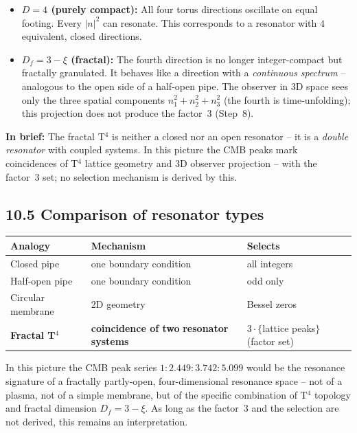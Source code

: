 \begin{itemize}
  \item \textbf{$D = 4$ (purely compact):} All four torus directions
        oscillate on equal footing. Every $|n|^2$ can resonate.
        This corresponds to a resonator with $4$ equivalent,
        closed directions.

  \item \textbf{$D_f = 3 - \xi$ (fractal):} The fourth direction is
        no longer integer-compact but fractally granulated.
        It behaves like a direction with a \emph{continuous
        spectrum} -- analogous to the open side of a half-open pipe.
        The observer in 3D space sees only the three spatial
        components $n_1^2+n_2^2+n_3^2$ (the fourth is time-unfolding);
        this projection does not produce the factor~3 (Step~8).
\end{itemize}

\textbf{In brief:} The fractal T$^4$ is neither a closed nor an
open resonator -- it is a \emph{double resonator} with coupled
systems. In this picture the CMB peaks mark coincidences of T$^4$
lattice geometry and 3D observer projection -- with the factor~3 set; no
selection mechanism is derived by this.

\subsection*{10.5 Comparison of resonator types}

\begin{center}
\begin{tabular}{p{3.5cm}p{3.5cm}p{5cm}}
\toprule
\textbf{Analogy} & \textbf{Mechanism} & \textbf{Selects} \\
\midrule
Closed pipe & one boundary condition & all integers \\
Half-open pipe & one boundary condition & odd only \\
Circular membrane & 2D geometry & Bessel zeros \\
\midrule
\textbf{Fractal T$^4$} &
  \textbf{coincidence of two} \newline \textbf{resonator systems} &
  $3 \cdot \{$lattice peaks$\}$ (factor set) \\
\bottomrule
\end{tabular}
\end{center}

In this picture the CMB peak series $1:2{.}449:3{.}742:5{.}099$ would be
the resonance signature of a fractally partly-open, four-dimensional
resonance space -- not of a plasma, not of a simple membrane, but of the
specific combination of T$^4$ topology and fractal dimension
$D_f = 3 - \xi$. As long as the factor~3 and the selection are not derived,
this remains an interpretation.

